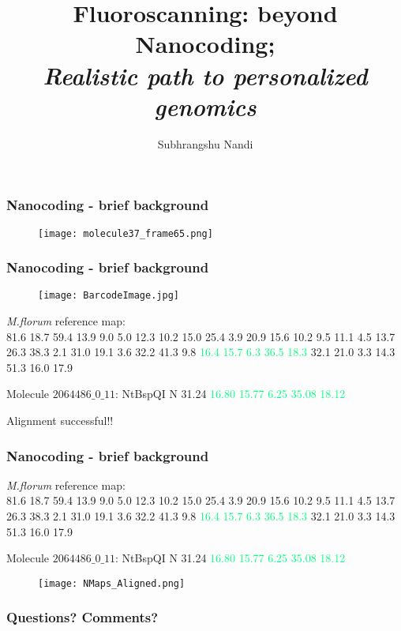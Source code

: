 \documentclass[10pt,dvipsnames,table]{beamer}
\title[Fluoroscanning: beyond nanocoding]{Fluoroscanning: beyond Nanocoding; \\ {\emph{Realistic path to personalized genomics}}}
\author{Subhrangshu Nandi}
\begin{document}
\setlength{\baselineskip}{16truept}
\frame{\maketitle}



\begin{frame}
\frametitle{Nanocoding - brief background}
\begin{figure}[T]
\texttt{[image: molecule37\_frame65.png]}
\end{figure}
\end{frame}

\begin{frame}
\frametitle{Nanocoding - brief background}
\begin{figure}[T]
\texttt{[image: BarcodeImage.jpg]}
\end{figure}

{\emph{M.florum}} reference map: \\
81.6 18.7 59.4 13.9 9.0 5.0 12.3 10.2 15.0 25.4 3.9 20.9 15.6 10.2 9.5 11.1 4.5 
13.7 26.3 38.3 2.1 31.0 19.1 3.6 32.2 41.3 9.8 \textcolor<3>{SpringGreen}{16.4 15.7 6.3 36.5 18.3} 32.1 21.0 
3.3 14.3 51.3 16.0 17.9

\pause
Molecule $2064486\_0\_11$: NtBspQI N  31.24  \textcolor<3>{SpringGreen}{16.80  15.77  6.25  35.08  18.12}

Alignment successful!!
\end{frame}

\begin{frame}
\frametitle{Nanocoding - brief background}
{\emph{M.florum}} reference map: \\
81.6 18.7 59.4 13.9 9.0 5.0 12.3 10.2 15.0 25.4 3.9 20.9 15.6 10.2 9.5 11.1 4.5 
13.7 26.3 38.3 2.1 31.0 19.1 3.6 32.2 41.3 9.8 \textcolor{SpringGreen}{16.4 15.7 6.3 36.5 18.3} 32.1 21.0 
3.3 14.3 51.3 16.0 17.9

Molecule $2064486\_0\_11$: NtBspQI N  31.24  \textcolor{SpringGreen}{16.80  15.77  6.25  35.08  18.12}

\begin{figure}[T]
\texttt{[image: NMaps\_Aligned.png]}
\end{figure}

\end{frame}

\begin{frame}
\frametitle{Questions? Comments?}

\end{frame}
\end{document}
